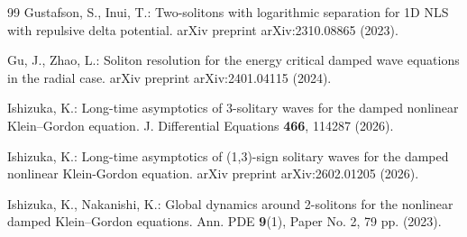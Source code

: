 \documentclass[reqno]{amsart}
\theoremstyle{plain}
\theoremstyle{definition}
\numberwithin{equation}{section}
\begin{document}
\begin{thebibliography}{99}
 Gustafson, S., Inui, T.:
Two-solitons with logarithmic separation for 1D NLS with repulsive delta potential.
arXiv preprint arXiv:2310.08865 (2023).


 Gu, J., Zhao, L.:
Soliton resolution for the energy critical damped wave equations in the radial case.
arXiv preprint arXiv:2401.04115 (2024).

%


 Ishizuka, K.:
Long-time asymptotics of 3-solitary waves for the damped nonlinear Klein--Gordon equation.
J. Differential Equations \textbf{466}, 114287 (2026).

 Ishizuka, K.:
Long-time asymptotics of (1,3)-sign solitary waves for the damped nonlinear Klein-Gordon equation.
arXiv preprint arXiv:2602.01205 (2026).


 Ishizuka, K., Nakanishi, K.:
Global dynamics around 2-solitons for the nonlinear damped Klein--Gordon equations.
Ann. PDE \textbf{9}(1), Paper No. 2, 79 pp. (2023).






\end{thebibliography}
\end{document}
